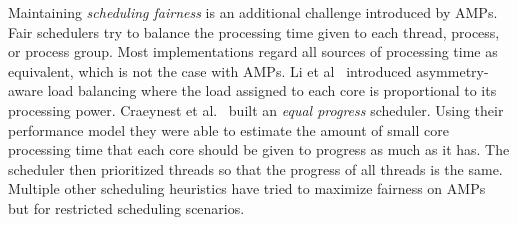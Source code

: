 Maintaining \emph{scheduling fairness} is an additional challenge introduced by AMPs. Fair schedulers try to balance the processing time given to each thread, process, or process group. Most implementations regard all sources of processing time as equivalent, which is not the case with AMPs. Li et al~\cite{li2007efficient} introduced asymmetry-aware load balancing where the load assigned to each core is proportional to its processing power. Craeynest et al.~\cite{van2013fairness} built an \emph{equal progress} scheduler. Using their performance model they were able to estimate the amount of small core processing time that each core should be given to progress as much as it has. The scheduler then prioritized threads so that the progress of all threads is the same. Multiple other scheduling heuristics have tried to maximize fairness on AMPs~\cite{zahedi2018amdahl,wang2016rebudget,kim2018exploring} but for restricted scheduling scenarios.


